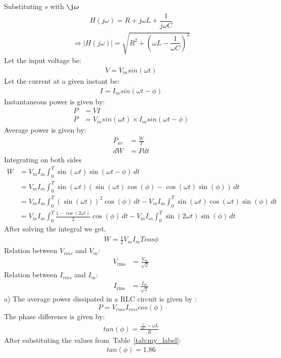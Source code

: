 \documentclass[journal,12pt,onecolumn]{IEEEtran}
\newcommand\tabref{Table~\ref}
\providecommand{\brak}[1]{\ensuremath{\left(#1\right)}}
\theoremstyle{remark}
\begin{document}
Substituting $s$ with $\j \omega$
\begin{align}
	H(j\omega) = R + j\omega L + \dfrac{1}{j\omega C}
\end{align}
\begin{align}
	\Rightarrow \lvert H(j\omega) \rvert = \sqrt{R^2 + \left(\omega L - \dfrac{1}{\omega C}\right)^2}
	\label{eq:1}
\end{align}
Let the input voltage be:
\begin{align}
	V=V_{m}sin\brak{\omega t}
\end{align}
Let the current at a given instant be:
\begin{align}
	I=I_{m}sin\brak{\omega t - \phi}
\end{align}
Instantaneous power is given by:
\begin{align}
	P &= VI\\
	P &= V_{m}sin\brak{\omega t} \times I_{m}sin\brak{\omega t - \phi}
\end{align}
Average power is given by:
\begin{align}
	P_{av} &= \frac{W}{T}\\
	dW &= Pdt
\end{align}
Integrating on both sides 
\begin{align}
	W &= V_{m}I_{m} \int_{0}^{T} \sin(\omega t) \sin(\omega t - \phi) \, dt \\
	&= V_{m}I_{m} \int_{0}^{T} \sin(\omega t)(\sin(\omega t)\cos(\phi) - \cos(\omega t)\sin(\phi)) \, dt \\
	&= V_{m}I_{m} \int_{0}^{T} (\sin(\omega t))^2\cos(\phi) \, dt - V_{m}I_{m} \int_{0}^{T} \sin(\omega t)\cos(\omega t)\sin(\phi) \, dt \\
	&= V_{m}I_{m} \int_{0}^{T} \frac{1 - \cos(2\omega t)}{2}\cos(\phi) \, dt - V_{m}I_{m} \int_{0}^{T} \sin(2\omega t)\sin(\phi) \, dt
\end{align}
After solving the integral we get,
\begin{align}
	W=\frac{1}{2}V_{m}I_{m}Tcos{\phi}
\end{align}
Relation between $V_{rms}$ and $V_m$:
\begin{align}
	V_{\text{rms}} &= \frac{V_{m}}{\sqrt{2}}
\end{align}	
Relation between $I_{rms}$ and $I_m$:
\begin{align}
	I_{\text{rms}} &= \frac{I_{m}}{\sqrt{2}}
\end{align}
a) The average power dissipated in a RLC circuit is given by :
\begin{equation}
	P=V_{rms} I_{rms} cos(\phi) 
	\label{eq:eq1}
\end{equation}
The phase difference is given by:
\begin{align}
	tan\brak{\phi} = \frac{\frac{1}{\omega C}-\omega L}{R}
\end{align}
After substituting the values from~\tabref{tab:my_label}:
\begin{align}
	tan\brak{\phi} = 1.86
\end{align}
\end{document}
